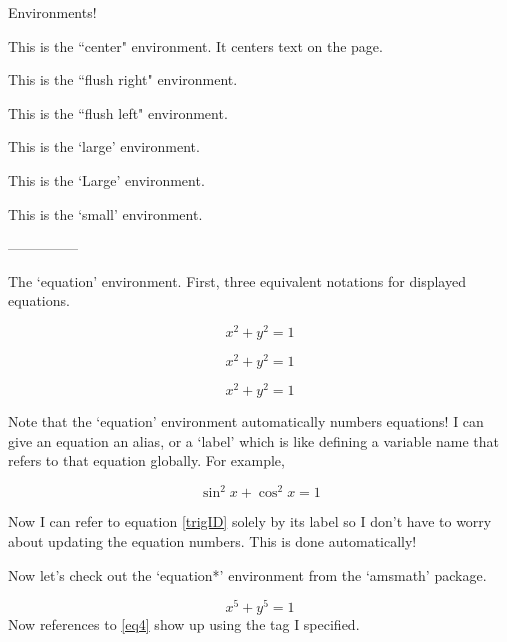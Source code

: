 \documentclass{article}
\begin{document}
Environments!

\begin{center}
This is the ``center" environment.  It centers text on the page.
\end{center}

\begin{flushright}
This is the ``flush right" environment.
\end{flushright}

\begin{flushleft}
This is the ``flush left" environment.
\end{flushleft}

\begin{large}
This is the `large' environment.
\end{large}

\begin{Large}
This is the `Large' environment.
\end{Large}

\begin{small}
This is the `small' environment.
\end{small}

---------------

The `equation' environment.  First, three equivalent notations for displayed equations.

$$x^2 + y^2 = 1$$

\[ x^2 + y^2 = 1\]

\begin{equation}
x^2 + y^2 = 1
\end{equation}

Note that the `equation' environment automatically numbers equations!  I can give an equation an alias, or a `label' which is like defining a variable name that refers to that equation globally.  For example,

\begin{equation}\label{trigID}
\sin^2 x + \cos^2 x = 1
\end{equation}

Now I can refer to equation \ref{trigID} solely by its label so I don't have to worry about updating the equation numbers.  This is done automatically!

Now let's check out the `equation*' environment from the `amsmath' package.

\begin{equation*}\tag{Eq 4}\label{eq4}
x^5 + y^5 = 1
\end{equation*}
Now references to \ref{eq4} show up using the tag I specified.
\end{document}
